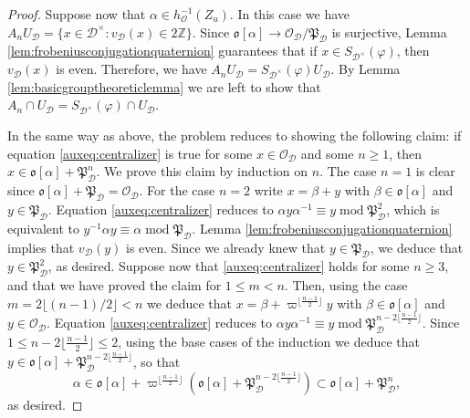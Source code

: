 \documentclass{article}
\theoremstyle{named}
\newcommand{\D}{\mathcal{D}}
\newcommand{\Z}{\mathbb{Z}}
\renewcommand{\O}{\mathcal{O}}
\renewcommand{\o}{\mathfrak{o}}
\renewcommand{\P}{\mathfrak{P}}
\DeclareMathOperator{\modulo}{mod}
\begin{document}
\begin{proof}
Suppose now that $\alpha\in h_\O^{-1}(Z_u)$. In this case we have $A_n U_\D = \{x \in \D^\times: v_\D(x) \in 2\Z\}$. Since $\o[\alpha] \rightarrow \O_\D/\P_\D$ is surjective, Lemma \ref{lem:frobeniusconjugationquaternion} guarantees that if $x \in S_{\D^\times}(\varphi)$, then $v_\D(x)$ is even. Therefore, we have $A_n U_\D = S_{\D^\times}(\varphi) U_\D$. By Lemma \ref{lem:basicgrouptheoreticlemma} we are left to show that $A_n \cap U_\D = S_{\D^\times}(\varphi) \cap U_\D$.

In the same way as above, the problem reduces to showing the following claim: if equation \eqref{auxeq:centralizer} is true for some $x \in \O_\D$ and some $n \geq 1$, then $x \in \o[\alpha] + \P_\D^n$. We prove this claim by induction on $n$. The case $n = 1$ is clear since $\o[\alpha] + \P_\D = \O_\D$. For the case $n = 2$ write $x = \beta + y$ with $\beta \in \o[\alpha]$ and $y \in \P_\D$. Equation \eqref{auxeq:centralizer} reduces to $\alpha y \alpha^{-1} \equiv  y \modulo \P_\D^2$, which is equivalent to $y^{-1}\alpha y \equiv \alpha \modulo \P_\D$. Lemma \ref{lem:frobeniusconjugationquaternion} implies that $v_\D(y)$ is even. Since we already knew that $y \in \P_\D$, we deduce that $y \in \P_\D^2$, as desired. Suppose now that \eqref{auxeq:centralizer} holds for some $n \geq 3$, and that we have proved the claim for $1 \leq m < n$. Then, using the case $m = 2\lfloor (n-1)/2\rfloor < n$ we deduce that $x = \beta + \varpi^{\lfloor \frac{n-1}{2}\rfloor} y$ with $\beta \in \o[\alpha]$ and $y \in \O_\D$. Equation \eqref{auxeq:centralizer} reduces to $\alpha y \alpha^{-1}\equiv y \modulo \P_\D^{n - 2\lfloor \frac{n-1}{2}\rfloor}$. Since $1 \leq n - 2\lfloor \frac{n-1}{2}\rfloor \leq 2$, using the base cases of the induction we deduce that $y \in \o[\alpha] + \P_\D^{n - 2\lfloor \frac{n-1}{2}\rfloor}$, so that 
\begin{equation*}
    \alpha \in \o[\alpha] + \varpi^{\lfloor \frac{n-1}{2}\rfloor} \left(\o[\alpha] + \P_\D^{n - 2\lfloor \frac{n-1}{2}\rfloor}\right) \subset \o[\alpha] + \P_\D^n,
\end{equation*}
as desired.
\end{proof}
\end{document}
